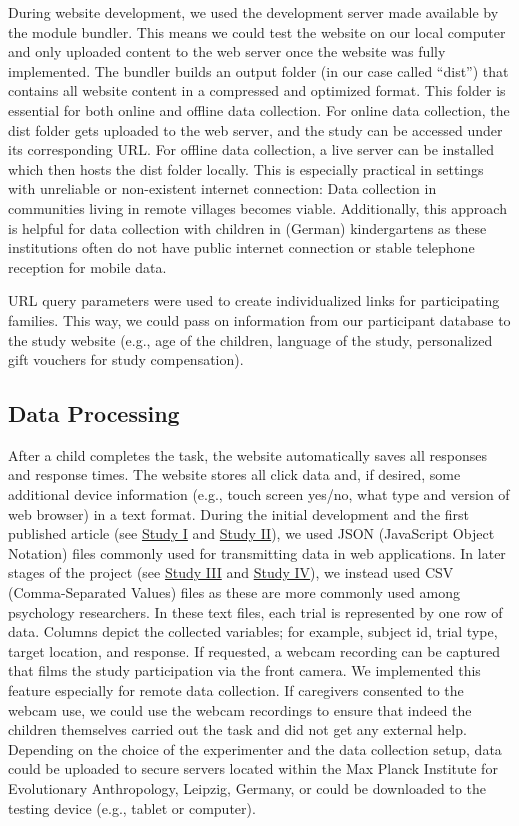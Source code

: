 \documentclass[
]{scrbook}
\begin{document}
During website development, we used the development server made available by the module bundler. This means we could test the website on our local computer and only uploaded content to the web server once the website was fully implemented. The bundler builds an output folder (in our case called ``dist'') that contains all website content in a compressed and optimized format. This folder is essential for both online and offline data collection. For online data collection, the dist folder gets uploaded to the web server, and the study can be accessed under its corresponding URL. For offline data collection, a live server can be installed which then hosts the dist folder locally. This is especially practical in settings with unreliable or non-existent internet connection: Data collection in communities living in remote villages becomes viable. Additionally, this approach is helpful for data collection with children in (German) kindergartens as these institutions often do not have public internet connection or stable telephone reception for mobile data.

URL query parameters were used to create individualized links for participating families. This way, we could pass on information from our participant database to the study website (e.g., age of the children, language of the study, personalized gift vouchers for study compensation).

\subsection{Data Processing}\label{approach-dataprocessing}

After a child completes the task, the website automatically saves all responses and response times. The website stores all click data and, if desired, some additional device information (e.g., touch screen yes/no, what type and version of web browser) in a text format. During the initial development and the first published article (see \hyperref[studyI]{Study I} and \hyperref[studyII]{Study II}), we used JSON (JavaScript Object Notation) files commonly used for transmitting data in web applications. In later stages of the project (see \hyperref[studyIII]{Study III} and \hyperref[studyIV]{Study IV}), we instead used CSV (Comma-Separated Values) files as these are more commonly used among psychology researchers. In these text files, each trial is represented by one row of data. Columns depict the collected variables; for example, subject id, trial type, target location, and response. If requested, a webcam recording can be captured that films the study participation via the front camera. We implemented this feature especially for remote data collection. If caregivers consented to the webcam use, we could use the webcam recordings to ensure that indeed the children themselves carried out the task and did not get any external help. Depending on the choice of the experimenter and the data collection setup, data could be uploaded to secure servers located within the Max Planck Institute for Evolutionary Anthropology, Leipzig, Germany, or could be downloaded to the testing device (e.g., tablet or computer).
\end{document}
